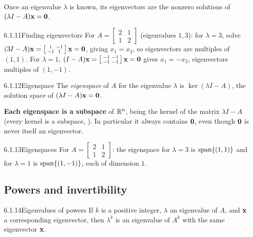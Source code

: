 Once an eigenvalue $\lambda$ is known, its eigenvectors are the nonzero solutions of $(\lambda I-A)\mathbf{x}=\mathbf{0}$.

\begin{exmp}{6.1.11}{Finding eigenvectors}
For $A=\left[\begin{smallmatrix}2&1\\1&2\end{smallmatrix}\right]$ (eigenvalues $1,3$): for $\lambda=3$, solve $(3I-A)\mathbf{x}=\left[\begin{smallmatrix}1&-1\\-1&1\end{smallmatrix}\right]\mathbf{x}=\mathbf{0}$, giving $x_1=x_2$, so eigenvectors are multiples of $(1,1)$. For $\lambda=1$, $(I-A)\mathbf{x}=\left[\begin{smallmatrix}-1&-1\\-1&-1\end{smallmatrix}\right]\mathbf{x}=\mathbf{0}$ gives $x_1=-x_2$, eigenvectors multiples of $(1,-1)$.
\end{exmp}

\begin{defns}{6.1.12}{Eigenspace}
The \emph{eigenspace} of $A$ for the eigenvalue $\lambda$ is $\ker(\lambda I-A)$, the solution space of $(\lambda I-A)\mathbf{x}=\mathbf{0}$.
\end{defns}

\begin{rmknote}
\textbf{Each eigenspace is a subspace} of $\mathbb{R}^n$, being the kernel of the matrix $\lambda I-A$ (every kernel is a subspace, ). In particular it always contains $\mathbf{0}$, even though $\mathbf{0}$ is never itself an eigenvector.
\end{rmknote}

\begin{exmp}{6.1.13}{Eigenspaces}
For $A=\left[\begin{smallmatrix}2&1\\1&2\end{smallmatrix}\right]$: the eigenspace for $\lambda=3$ is $\operatorname{span}\{(1,1)\}$ and for $\lambda=1$ is $\operatorname{span}\{(1,-1)\}$, each of dimension $1$.
\end{exmp}

\subsection{Powers and invertibility}

\begin{thms}{6.1.14}{Eigenvalues of powers}
If $k$ is a positive integer, $\lambda$ an eigenvalue of $A$, and $\mathbf{x}$ a corresponding eigenvector, then $\lambda^k$ is an eigenvalue of $A^k$ with the same eigenvector $\mathbf{x}$.
\end{thms}

